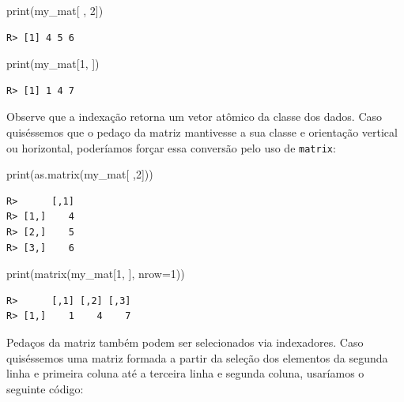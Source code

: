 \documentclass[
  11pt,
]{book}
\newenvironment{Shaded}{\begin{snugshade}}{\end{snugshade}}
\newcommand{\AttributeTok}[1]{\textcolor[rgb]{0.61,0.61,0.61}{#1}}
\newcommand{\DecValTok}[1]{\textcolor[rgb]{0.06,0.06,0.06}{#1}}
\newcommand{\FunctionTok}[1]{\textcolor[rgb]{0,0,0}{#1}}
\newcommand{\NormalTok}[1]{#1}
\begin{document}
\begin{Shaded}
\begin{Highlighting}[]
\FunctionTok{print}\NormalTok{(my\_mat[ , }\DecValTok{2}\NormalTok{])}
\end{Highlighting}
\end{Shaded}

\begin{verbatim}
R> [1] 4 5 6
\end{verbatim}

\begin{Shaded}
\begin{Highlighting}[]
\FunctionTok{print}\NormalTok{(my\_mat[}\DecValTok{1}\NormalTok{, ])}
\end{Highlighting}
\end{Shaded}

\begin{verbatim}
R> [1] 1 4 7
\end{verbatim}

Observe que a indexação retorna um vetor atômico da classe dos dados. Caso quiséssemos que o pedaço da matriz mantivesse a sua classe e orientação vertical ou horizontal, poderíamos forçar essa conversão pelo uso de \texttt{matrix}:

\begin{Shaded}
\begin{Highlighting}[]
\FunctionTok{print}\NormalTok{(}\FunctionTok{as.matrix}\NormalTok{(my\_mat[ ,}\DecValTok{2}\NormalTok{]))}
\end{Highlighting}
\end{Shaded}

\begin{verbatim}
R>      [,1]
R> [1,]    4
R> [2,]    5
R> [3,]    6
\end{verbatim}

\begin{Shaded}
\begin{Highlighting}[]
\FunctionTok{print}\NormalTok{(}\FunctionTok{matrix}\NormalTok{(my\_mat[}\DecValTok{1}\NormalTok{, ], }\AttributeTok{nrow=}\DecValTok{1}\NormalTok{))}
\end{Highlighting}
\end{Shaded}

\begin{verbatim}
R>      [,1] [,2] [,3]
R> [1,]    1    4    7
\end{verbatim}

Pedaços da matriz também podem ser selecionados via indexadores. Caso quiséssemos uma matriz formada a partir da seleção dos elementos da segunda linha e primeira coluna até a terceira linha e segunda coluna, usaríamos o seguinte código:
\end{document}
